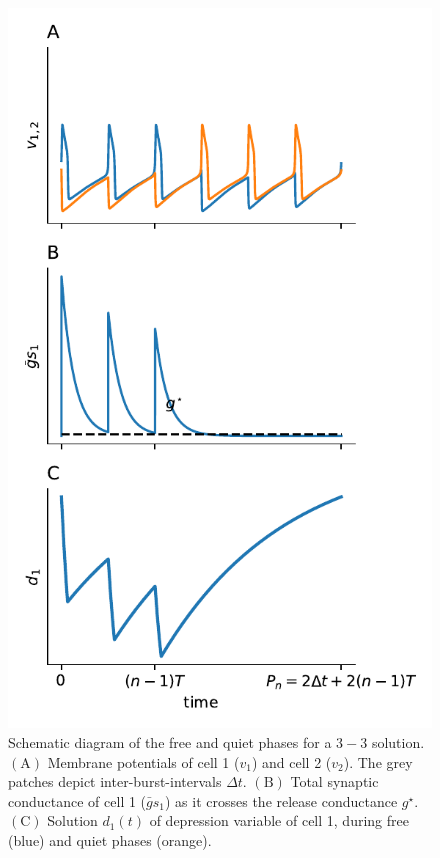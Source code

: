 \documentclass[utf8]{frontiersFPHY} %
\newcommand{\gbar}{\bar g}
\newcommand{\delt}{\Delta t}
\begin{document}
\begin{figure}[h!]
  \centering
  \includegraphics{free-quiet}
  \caption{Schematic diagram of the free and quiet phases for a $3-3$ solution.
    $\bm{\mathrm{(A)}}$ Membrane potentials of cell 1 ($v_{1}$) and cell 2 ($v_{2}$).
    The grey patches depict inter-burst-intervals $\delt$. $\bm{\mathrm{(B)}}$ Total
    synaptic conductance of cell 1 ($\gbar s_1$) as it crosses the release conductance
    $g^{\star}$. $\bm{\mathrm{(C)}}$ Solution $d_1(t)$ of depression variable of cell
    1, during free (blue) and quiet phases (orange).~\label{fig:free-quiet}}
\end{figure}
\end{document}
